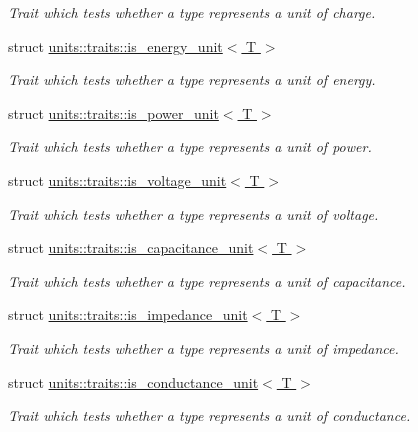 \begin{DoxyCompactItemize}
\begin{DoxyCompactList}\small\item\em Trait which tests whether a type represents a unit of charge. \end{DoxyCompactList}\item 
struct \hyperlink{structunits_1_1traits_1_1is__energy__unit}{units\+::traits\+::is\+\_\+energy\+\_\+unit$<$ T $>$}
\begin{DoxyCompactList}\small\item\em Trait which tests whether a type represents a unit of energy. \end{DoxyCompactList}\item 
struct \hyperlink{structunits_1_1traits_1_1is__power__unit}{units\+::traits\+::is\+\_\+power\+\_\+unit$<$ T $>$}
\begin{DoxyCompactList}\small\item\em Trait which tests whether a type represents a unit of power. \end{DoxyCompactList}\item 
struct \hyperlink{structunits_1_1traits_1_1is__voltage__unit}{units\+::traits\+::is\+\_\+voltage\+\_\+unit$<$ T $>$}
\begin{DoxyCompactList}\small\item\em Trait which tests whether a type represents a unit of voltage. \end{DoxyCompactList}\item 
struct \hyperlink{structunits_1_1traits_1_1is__capacitance__unit}{units\+::traits\+::is\+\_\+capacitance\+\_\+unit$<$ T $>$}
\begin{DoxyCompactList}\small\item\em Trait which tests whether a type represents a unit of capacitance. \end{DoxyCompactList}\item 
struct \hyperlink{structunits_1_1traits_1_1is__impedance__unit}{units\+::traits\+::is\+\_\+impedance\+\_\+unit$<$ T $>$}
\begin{DoxyCompactList}\small\item\em Trait which tests whether a type represents a unit of impedance. \end{DoxyCompactList}\item 
struct \hyperlink{structunits_1_1traits_1_1is__conductance__unit}{units\+::traits\+::is\+\_\+conductance\+\_\+unit$<$ T $>$}
\begin{DoxyCompactList}\small\item\em Trait which tests whether a type represents a unit of conductance. \end{DoxyCompactList}\item 

\end{DoxyCompactItemize}
